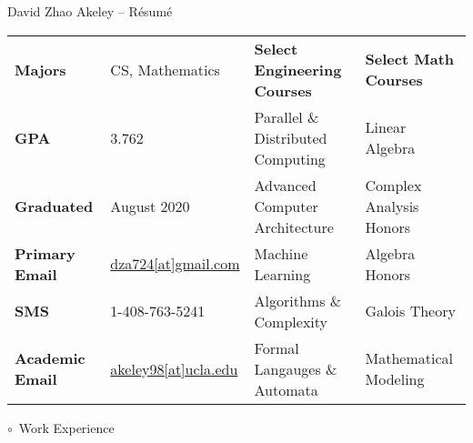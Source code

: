 \documentclass[11pt]{article}
\makeatletter
\newcommand{\email}[2]{{\small \color{webColor} \textsf{\href{mailto:#1@#2}{#1[at]#2}}}}
\newcommand{\myTitle}[1]{{ \vspace{2mm} \LARGE \color{titleColor} \hspace{-12mm} \( \circ \)\ \textsf{#1} \vspace{2mm}}}
\newcommand{\myKey}[1]{{\color{keyColor}\textbf{#1}}}
\newcommand{\GPA}{3.762}
\makeatother
\begin{document}
\reversemarginpar
\begin{center}
\textsf{ \LARGE  \color{titleColor} David Zhao Akeley -- Résumé }


\end{center}

\begin{tabular}{l l|l l}
\myKey{Majors} & CS, Mathematics
 & \myKey{Select Engineering Courses} & \myKey{Select Math Courses} \\
\myKey{GPA} & \GPA & Parallel \& Distributed Computing & Linear Algebra \\
\myKey{Graduated} & August 2020
 & Advanced Computer Architecture & Complex Analysis Honors \\
\myKey{Primary Email} & \email{dza724}{gmail.com}
 & Machine Learning & Algebra Honors \\
\myKey{SMS} & 1-408-763-5241
 & Algorithms \& Complexity & Galois Theory \\
\myKey{Academic Email} & \email{akeley98}{ucla.edu}
 & Formal Langauges \& Automata & Mathematical Modeling
\end{tabular}

\vspace{0.1mm}

\myTitle{Work Experience}
\end{document}
